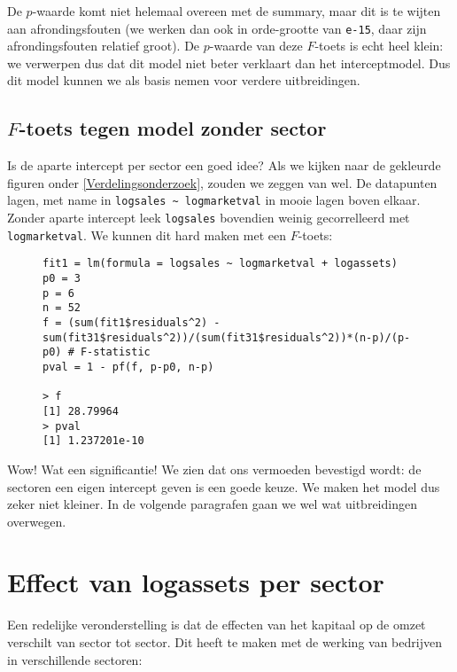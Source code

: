 \documentclass[a4paper]{report}
\begin{document}
  De $p$-waarde komt niet helemaal overeen met de summary, maar dit is te wijten aan afrondingsfouten (we werken dan ook in orde-grootte van \verb!e-15!, daar zijn afrondingsfouten relatief groot). De $p$-waarde van deze $F$-toets is echt heel klein: we verwerpen dus dat dit model niet beter verklaart dan het interceptmodel. Dus dit model kunnen we als basis nemen voor verdere uitbreidingen.
  
\subsection{$F$-toets tegen model zonder sector}
  Is de aparte intercept per sector een goed idee? Als we kijken naar de gekleurde figuren onder \ref{Verdelingsonderzoek}, zouden we zeggen van wel. De datapunten lagen, met name in \verb!logsales ~ logmarketval! in mooie lagen boven elkaar. Zonder aparte intercept leek \verb!logsales! bovendien weinig gecorrelleerd met \verb!logmarketval!. We kunnen dit hard maken met een $F$-toets:
  
  \begin{figure}[H]
  \begin{verbatim}
fit1 = lm(formula = logsales ~ logmarketval + logassets)
p0 = 3
p = 6
n = 52
f = (sum(fit1$residuals^2) - sum(fit31$residuals^2))/(sum(fit31$residuals^2))*(n-p)/(p-p0) # F-statistic
pval = 1 - pf(f, p-p0, n-p)

> f 
[1] 28.79964
> pval
[1] 1.237201e-10
  \end{verbatim}
  \end{figure}
  
  Wow! Wat een significantie! We zien dat ons vermoeden bevestigd wordt: de sectoren een eigen intercept geven is een goede keuze. We maken het model dus zeker niet kleiner. In de volgende paragrafen gaan we wel wat uitbreidingen overwegen.
  
\section{Effect van logassets per sector}
\label{uitbreiding logassets:sector}
  Een redelijke veronderstelling is dat de effecten van het kapitaal op de omzet verschilt van sector tot sector. Dit heeft te maken met de werking van bedrijven in verschillende sectoren: 
\end{document}
